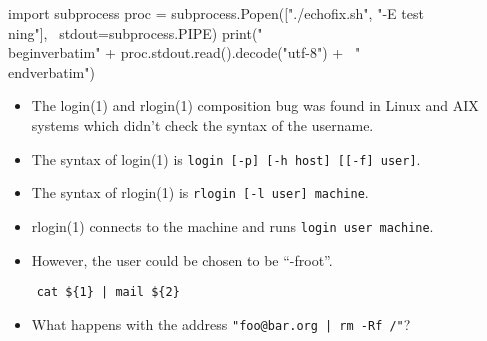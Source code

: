 \begin{frame}[fragile]
  \begin{example}
    \inputminted{sh}{echofix.sh}
    \begin{pycode}[echofix.sh]
import subprocess
proc = subprocess.Popen(["./echofix.sh", "-E test\\ning"], \
stdout=subprocess.PIPE)
print("\\begin{verbatim}" + proc.stdout.read().decode("utf-8") + \
"\\end{verbatim}")
    \end{pycode}
  \end{example}
\end{frame}

\begin{frame}
  \begin{itemize}
    \item The login(1) and rlogin(1) composition bug was found in Linux and AIX 
      systems which didn't check the syntax of the username.

    \item The syntax of login(1) is \texttt{login [-p] [-h host] [[-f] 
        user]}.

    \item The syntax of rlogin(1) is \texttt{rlogin [-l user] machine}.

    \item rlogin(1) connects to the machine and runs \texttt{login user 
        machine}.

    \item However, the user could be chosen to be \enquote{-froot}.
  \end{itemize}
\end{frame}

%


\begin{frame}[fragile]
  \begin{verbatim}
    cat ${1} | mail ${2}
  \end{verbatim}
  \begin{itemize}
    \item What happens with the address
      \texttt{"foo@bar.org | rm -Rf /"}?
  \end{itemize}
\end{frame}

